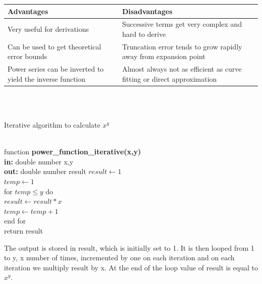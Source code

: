 \documentclass{article}
\begin{document}
\setlength{\tabcolsep}{18pt}
\renewcommand{\arraystretch}{1.5}
\begin{tabular}{ |p{6cm}|p{6cm}| }
\hline
\textbf{Advantages} & \textbf{Disadvantages}\\ \hline 
Very useful for derivations
 & Successive terms get very complex and hard to derive\\
\hline
Can be used to get theoretical error bounds &Truncation error tends to grow rapidly away from expansion point\\
\hline
Power series can be inverted to yield the inverse function & Almost always not as efficient as curve fitting or direct approximation\\
\hline
\end{tabular} \\ \\ 

\begin{algorithm}
\caption{Iterative algorithm to calculate $x^y$}
\begin{algorithmic}
\\ function \textbf{power\_function\_iterative(x,y)}\\
\textbf{in: } double number x,y\\
\textbf{out: } double number result
		\State $result \leftarrow 1$\\
   		 \State $temp \leftarrow 1$\\
for {$temp \leq y$} do\\
 \indent\qquad\State $result \leftarrow result*x$\\
 \indent\qquad\State $temp \leftarrow temp+1$\\
 end for \\
\State return result\\
\end{algorithmic}
\end{algorithm}

The output is stored in result, which is initially set to 1. It is then looped from 1 to y, x number of times, incremented by one on each iteration and on each iteration we multiply result by x. At the end of the loop value of result is equal to $x^y$.
\end{document}
